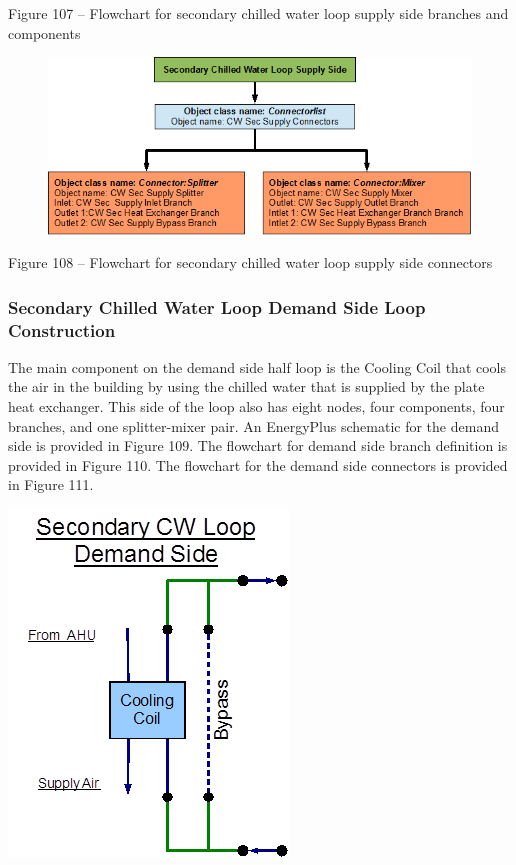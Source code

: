 Figure 107 -- Flowchart for secondary chilled water loop supply side branches and components

\begin{figure}[htbp]
\centering
\includegraphics{media/image108.png}
\caption{}
\end{figure}

Figure 108 -- Flowchart for secondary chilled water loop supply side connectors

\subsubsection{Secondary Chilled Water Loop Demand Side Loop Construction}\label{secondary-chilled-water-loop-demand-side-loop-construction}

The main component on the demand side half loop is the Cooling Coil that cools the air in the building by using the chilled water that is supplied by the plate heat exchanger. This side of the loop also has eight nodes, four components, four branches, and one splitter-mixer pair. An EnergyPlus schematic for the demand side is provided in Figure 109. The flowchart for demand side branch definition is provided in Figure 110. The flowchart for the demand side connectors is provided in Figure 111.

\textbf{\includegraphics{media/image109.png}}

